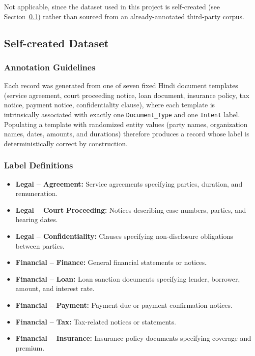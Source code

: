 Not applicable, since the dataset used in this project is self-created (see Section~\ref{subsec:selfcreated}) rather than sourced from an already-annotated third-party corpus.


\subsection{Self-created Dataset}
\label{subsec:selfcreated}

\subsubsection*{Annotation Guidelines}

Each record was generated from one of seven fixed Hindi document templates (service agreement, court proceeding notice, loan document, insurance policy, tax notice, payment notice, confidentiality clause), where each template is intrinsically associated with exactly one \texttt{Document\_Type} and one \texttt{Intent} label. Populating a template with randomized entity values (party names, organization names, dates, amounts, and durations) therefore produces a record whose label is deterministically correct by construction.

\subsubsection*{Label Definitions}

\begin{itemize}
    \item \textbf{Legal -- Agreement:} Service agreements specifying parties, duration, and remuneration.
    \item \textbf{Legal -- Court Proceeding:} Notices describing case numbers, parties, and hearing dates.
    \item \textbf{Legal -- Confidentiality:} Clauses specifying non-disclosure obligations between parties.
    \item \textbf{Financial -- Finance:} General financial statements or notices.
    \item \textbf{Financial -- Loan:} Loan sanction documents specifying lender, borrower, amount, and interest rate.
    \item \textbf{Financial -- Payment:} Payment due or payment confirmation notices.
    \item \textbf{Financial -- Tax:} Tax-related notices or statements.
    \item \textbf{Financial -- Insurance:} Insurance policy documents specifying coverage and premium.
\end{itemize}

